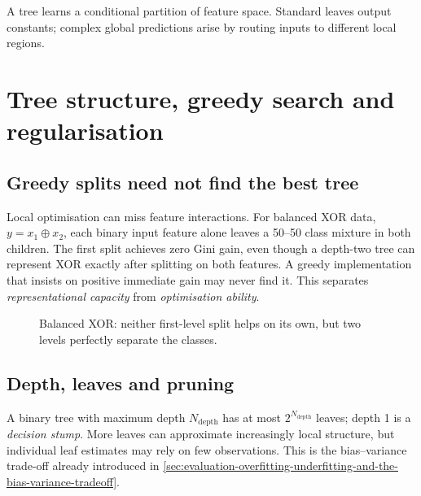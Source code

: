 \begin{calloutintuition}
A tree learns a conditional partition of feature space.
Standard leaves output constants; complex global predictions arise by routing inputs to different local regions.
\end{calloutintuition}

\section{Tree structure, greedy search and regularisation}
\label{sec:trees-tree-structure-greedy-search-and-regularisation}
\subsection{Greedy splits need not find the best tree}
\label{subsec:trees-greedy-splits-need-not-find-the-best-tree}
Local optimisation can miss feature interactions.
For balanced XOR data, $y=x_1\oplus x_2$, each binary input feature alone leaves a 50--50 class mixture in both children.
The first split achieves zero Gini gain, even though a depth-two tree can represent XOR exactly after splitting on both features.
A greedy implementation that insists on positive immediate gain may never find it.
This separates \emph{representational capacity} from \emph{optimisation ability}.

\begin{figure}[htbp]\centering
{}
\caption{Balanced XOR: neither first-level split helps on its own, but two levels perfectly separate the classes.}
\label{fig:tree_xor}
\end{figure}

\subsection{Depth, leaves and pruning}
\label{subsec:trees-depth-leaves-and-pruning}
A binary tree with maximum depth $N_{\text{depth}}$ has at most $2^{N_{\text{depth}}}$ leaves; depth 1 is a \emph{decision stump}.
More leaves can approximate increasingly local structure, but individual leaf estimates may rely on few observations.
This is the bias--variance trade-off already introduced in \cref{sec:evaluation-overfitting-underfitting-and-the-bias-variance-tradeoff}.

